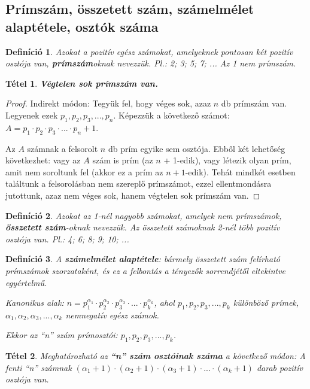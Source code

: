 \documentclass[12pt,a4paper]{article}
\newtheorem{theorem}{Tétel} [section]
\newtheorem{definition}{Definíció} [section]
\begin{document}
\subsection{Prímszám, összetett szám, számelmélet alaptétele, osztók száma}

\begin{definition}
Azokat a pozitív egész számokat, amelyeknek pontosan két pozitív osztója van, \textbf{prímszám}oknak nevezzük. Pl.: 2; 3; 5; 7; ... Az 1 nem prímszám.
\end{definition}

\begin{theorem}
\textbf{Végtelen sok prímszám van.}
\end{theorem}
\begin{proof}
Indirekt módon: Tegyük fel, hogy véges sok, azaz $n$ db prímszám van. Legyenek ezek $p_1, p_2, p_3, ..., p_n$. Képezzük a következő számot: $A = p_1 \cdot p_2 \cdot p_3 \cdot ... \cdot p_n +1$.

Az $A$ számnak a felsorolt $n$ db prím egyike sem osztója. Ebből két lehetőség következhet: vagy az $A$ szám is prím (az $n$ + 1-edik), vagy létezik olyan prím, amit nem soroltunk fel (akkor ez a prím az $n + 1$-edik). Tehát mindkét esetben találtunk a felsorolásban nem szereplő prímszámot, ezzel ellentmondásra jutottunk, azaz nem véges sok, hanem végtelen sok prímszám van.
\end{proof}

\begin{definition}
Azokat az 1-nél nagyobb számokat, amelyek nem prímszámok, \textbf{összetett szám}-oknak nevezzük. Az összetett számoknak 2-nél több pozitív osztója van. Pl.: 4; 6; 8; 9; 10; ...
\end{definition}

\begin{definition}
A \textbf{számelmélet alaptétele}: bármely összetett szám felírható prímszámok szorzataként, és ez a felbontás a tényezők sorrendjétől eltekintve egyértelmű.

Kanonikus alak: $n=p_1^{\alpha_1} \cdot p_2^{\alpha_2} \cdot p_3^{\alpha_3} \cdot ... \cdot  p_k^{\alpha_k}$, ahol $p_1, p_2, p_3, ..., p_k$ különböző prímek, $\alpha_1, \alpha_2, \alpha_3, ..., \alpha_k$ nemnegatív egész számok.

Ekkor az ``n'' szám prímosztói: $p_1, p_2, p_3, ..., p_k$.
\end{definition}

\begin{theorem}
Meghatározható az \textbf{``n'' szám osztóinak száma} a következő módon: A fenti ``n'' számnak $(\alpha_1 + 1) \cdot (\alpha_2 + 1) \cdot (\alpha_3 + 1) \cdot ... \cdot (\alpha_k + 1)$ darab pozitív osztója van.
\end{theorem}
\end{document}
